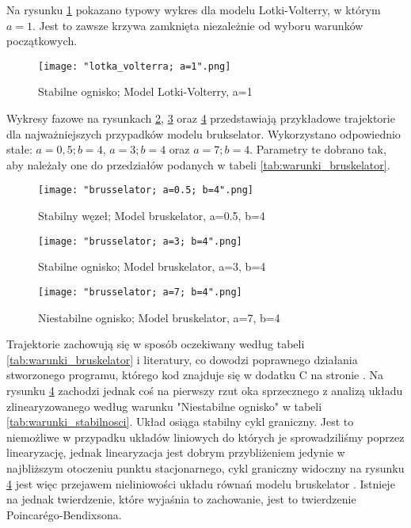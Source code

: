 \documentclass[10pt, a4paper, twoside, onecolumn]{article}
\numberwithin{equation}{section}
\begin{document}
	Na rysunku \ref{fig:stabilne_ognisko_lotka_volterra} pokazano typowy wykres dla modelu Lotki-Volterry, w którym \(a=1\). Jest to zawsze krzywa zamknięta niezależnie od wyboru warunków początkowych. 
	\begin{figure}[H]
			\centering
			\texttt{[image: "lotka\_volterra; a=1".png]}
			\caption{Stabilne ognisko; Model Lotki-Volterry, a=1}
			\label{fig:stabilne_ognisko_lotka_volterra}
		\end{figure}
	Wykresy fazowe na rysunkach \ref{fig:stabilny_wezel}, \ref{fig:stabilne_ognisko} oraz \ref{fig:niestabilne_ognisko} przedstawiają przykładowe trajektorie dla najważniejszych przypadków modelu brukselator. Wykorzystano odpowiednio stałe: \(a=0,5; b=4\), \(a=3; b=4\) oraz \(a=7; b=4\). Parametry te dobrano tak, aby należały one do przedziałów podanych w tabeli \ref{tab:warunki_bruskelator}. \par
	\begin{figure}[H]
		\centering
		\texttt{[image: "brusselator; a=0.5; b=4".png]}
		\caption{Stabilny węzeł; Model bruskelator, a=0.5, b=4}
		\label{fig:stabilny_wezel}
	\end{figure}
	\begin{figure}[H]
		\centering
		\texttt{[image: "brusselator; a=3; b=4".png]}
		\caption{Stabilne ognisko; Model bruskelator, a=3, b=4}
		\label{fig:stabilne_ognisko}
	\end{figure}
	\begin{figure}[H]
		\centering
		\texttt{[image: "brusselator; a=7; b=4".png]}
		\caption{Niestabilne ognisko; Model bruskelator, a=7, b=4}
		\label{fig:niestabilne_ognisko}
	\end{figure}
	Trajektorie zachowują się w sposób oczekiwany według tabeli \ref{tab:warunki_bruskelator} i literatury, co dowodzi poprawnego działania stworzonego programu, którego kod znajduje się w dodatku C na stronie \pageref{sec: dodatek C} \cite{orlik}. Na rysunku \ref{fig:niestabilne_ognisko} zachodzi jednak coś na pierwszy rzut oka sprzecznego z analizą układu zlinearyzowanego według warunku "Niestabilne ognisko" w tabeli \ref{tab:warunki_stabilnosci}. Układ osiąga stabilny cykl graniczny. Jest to niemożliwe w przypadku układów liniowych do których je sprowadziliśmy poprzez linearyzację, jednak linearyzacja jest dobrym przybliżeniem jedynie w najbliższym otoczeniu punktu stacjonarnego, cykl graniczny widoczny na rysunku \ref{fig:niestabilne_ognisko} jest więc przejawem nieliniowości układu równań modelu bruskelator \cite{orlik}. Istnieje na jednak twierdzenie, które wyjaśnia to zachowanie, jest to twierdzenie Poincar\'{e}go-Bendixsona. \par
\end{document}
